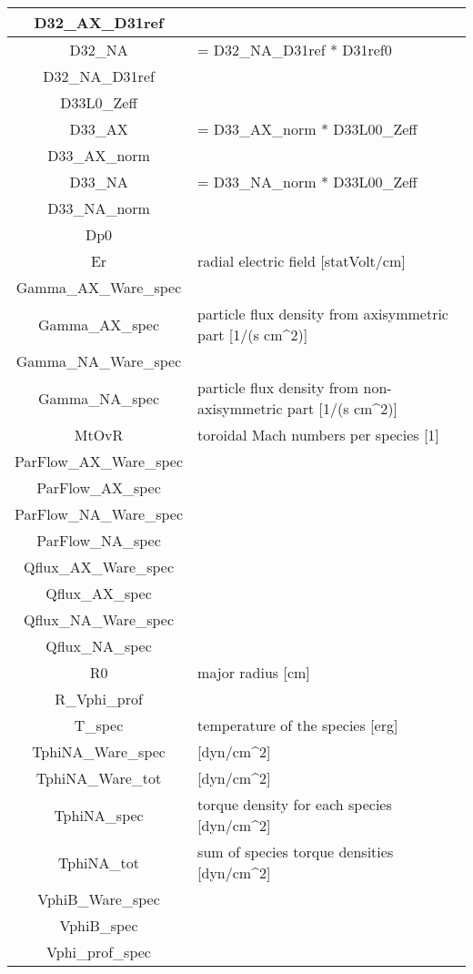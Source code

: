 \begin{table}[h]
\begin{tabular}{|c|l|}
\hline
D32\_AX\_D31ref & \\
\hline
D32\_NA & = D32\_NA\_D31ref * D31ref0 \\
\hline
D32\_NA\_D31ref & \\
\hline
D33L0\_Zeff & \\
\hline
D33\_AX & = D33\_AX\_norm * D33L00\_Zeff \\
\hline
D33\_AX\_norm & \\
\hline
D33\_NA & = D33\_NA\_norm * D33L00\_Zeff \\
\hline
D33\_NA\_norm & \\
\hline
Dp0 & \\
\hline
Er & radial electric field [statVolt/cm] \\
\hline
Gamma\_AX\_Ware\_spec & \\
\hline
Gamma\_AX\_spec & particle flux density from axisymmetric part [1/(s cm^2)] \\
\hline
Gamma\_NA\_Ware\_spec & \\
\hline
Gamma\_NA\_spec & particle flux density from non-axisymmetric part [1/(s cm^2)] \\
\hline
MtOvR & toroidal Mach numbers per species [1] \\
\hline
ParFlow\_AX\_Ware\_spec & \\
\hline
ParFlow\_AX\_spec & \\
\hline
ParFlow\_NA\_Ware\_spec & \\
\hline
ParFlow\_NA\_spec & \\
\hline
Qflux\_AX\_Ware\_spec & \\
\hline
Qflux\_AX\_spec & \\
\hline
Qflux\_NA\_Ware\_spec & \\
\hline
Qflux\_NA\_spec & \\
\hline
R0 & major radius [cm] \\
\hline
R\_Vphi\_prof & \\
\hline
T\_spec & temperature of the species [erg] \\
\hline
TphiNA\_Ware\_spec & [dyn/cm^2] \\
\hline
TphiNA\_Ware\_tot & [dyn/cm^2] \\
\hline
TphiNA\_spec & torque density for each species [dyn/cm^2] \\
\hline
TphiNA\_tot & sum of species torque densities [dyn/cm^2] \\
\hline
VphiB\_Ware\_spec & \\
\hline
VphiB\_spec & \\
\hline
Vphi\_prof\_spec & \\

\end{tabular}
\end{table}
